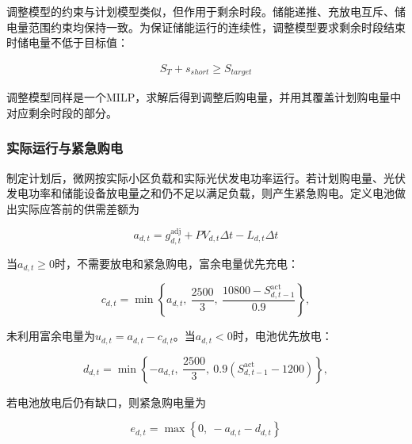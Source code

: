 \documentclass[UTF8]{ctexart}
\begin{document}
    调整模型的约束与计划模型类似，但作用于剩余时段。储能递推、充放电互斥、储电量范围约束均保持一致。为保证储能运行的连续性，调整模型要求剩余时段结束时储电量不低于目标值：
    
    \begin{equation}
        \begin{aligned}
            S_{T} + s_{short} \geq S_{target}
        \end{aligned}
    \end{equation}
    
    调整模型同样是一个MILP，求解后得到调整后购电量，并用其覆盖计划购电量中对应剩余时段的部分。\par
    
    
    \subsubsection{实际运行与紧急购电}
    
    制定计划后，微网按实际小区负载和实际光伏发电功率运行。若计划购电量、光伏发电功率和储能设备放电量之和仍不足以满足负载，则产生紧急购电。定义电池做出实际应答前的供需差额为
    
    \begin{equation}
        a_{d,t} = g_{d,t}^{\mathrm{adj}} + PV_{d,t} \Delta t - L_{d,t}\Delta t
    \end{equation}
    
    当$a_{d,t} \geq 0$时，不需要放电和紧急购电，富余电量优先充电：
    
    \begin{equation}
        c_{d,t} = \min \left\{
        a_{d,t},\ 
        \frac{2500}{3},\ 
        \frac{10800 - S_{d, t - 1}^{\mathrm{act}}}{0.9}
        \right\},
    \end{equation}
    
    未利用富余电量为$u_{d,t} = a_{d,t} - c_{d,t}$。当$a_{d,t} < 0$时，电池优先放电：
    
    \begin{equation}
        d_{d,t} =\min \left\{
        -a_{d,t},\ 
        \frac{2500}{3},\ 
        0.9\left(S_{d, t - 1}^{\mathrm{act}} - 1200\right)
        \right\},
    \end{equation}
    
    若电池放电后仍有缺口，则紧急购电量为
    
    \begin{equation}
        e_{d,t} = \max \left\{
        0,\ 
        -a_{d,t}-d_{d,t}
        \right\}
    \end{equation}
    
\end{document}

